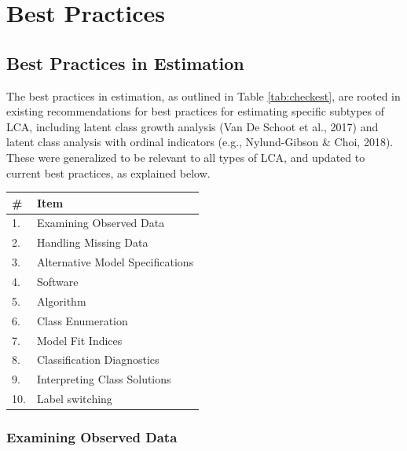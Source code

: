 \documentclass[
  ,man,floatsintext]{apa6}
\begin{document}
\hypertarget{best-practices}{%
\section{Best Practices}\label{best-practices}}

\hypertarget{best-practices-in-estimation}{%
\subsection{Best Practices in Estimation}\label{best-practices-in-estimation}}

The best practices in estimation, as outlined in Table
\ref{tab:checkest}, are rooted in existing recommendations for best
practices for estimating specific subtypes of LCA, including latent
class growth analysis (Van De Schoot et al., 2017) and latent
class analysis with ordinal indicators (e.g., Nylund-Gibson \& Choi, 2018).
These were generalized to be relevant to all types of LCA, and updated
to current best practices, as explained below.

\begin{tabular}[t]{l|l}
\hline
\# & Item\\
\hline
1. & Examining Observed Data\\
\hline
2. & Handling Missing Data\\
\hline
3. & Alternative Model Specifications\\
\hline
4. & Software\\
\hline
5. & Algorithm\\
\hline
6. & Class Enumeration\\
\hline
7. & Model Fit Indices\\
\hline
8. & Classification Diagnostics\\
\hline
9. & Interpreting Class Solutions\\
\hline
10. & Label switching\\
\hline
\end{tabular}

\hypertarget{examining-observed-data}{%
\subsubsection{Examining Observed Data}\label{examining-observed-data}}
\end{document}
